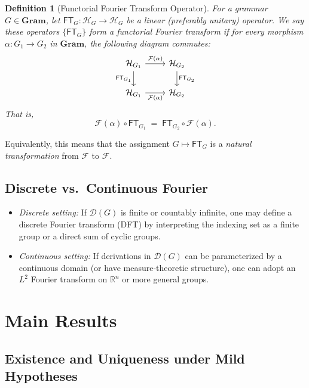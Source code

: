 \documentclass[11pt]{article}
\newtheorem{definition}{Definition}[section]
\begin{document}
\begin{definition}[Functorial Fourier Transform Operator]
For a grammar \(G\in \mathbf{Gram}\), let \(\mathsf{FT}_G : \mathcal{H}_G \to \mathcal{H}_G\) be a linear (preferably unitary) operator. We say these operators \(\{\mathsf{FT}_G\}\) form a \emph{functorial Fourier transform} if for every morphism \(\alpha: G_1 \to G_2\) in \(\mathbf{Gram}\), the following diagram commutes:
\[
\begin{tikzcd}
\mathcal{H}_{G_1} \arrow[r, "\mathcal{F}(\alpha)"] \arrow[d, "\mathsf{FT}_{G_1}"']
& \mathcal{H}_{G_2} \arrow[d, "\mathsf{FT}_{G_2}"] \\
\mathcal{H}_{G_1} \arrow[r, "\mathcal{F}(\alpha)"']
& \mathcal{H}_{G_2}
\end{tikzcd}
\]
That is, 
\[
\mathcal{F}(\alpha) \circ \mathsf{FT}_{G_1} \;=\; \mathsf{FT}_{G_2} \circ \mathcal{F}(\alpha).
\]
\end{definition}

Equivalently, this means that the assignment \(G \mapsto \mathsf{FT}_G\) is a \emph{natural transformation} from \(\mathcal{F}\) to \(\mathcal{F}\).

\subsection{Discrete vs.~Continuous Fourier}

\begin{itemize}
\item \emph{Discrete setting:} If \(\mathcal{D}(G)\) is finite or countably infinite, one may define a discrete Fourier transform (DFT) by interpreting the indexing set as a finite group or a direct sum of cyclic groups.
\item \emph{Continuous setting:} If derivations in \(\mathcal{D}(G)\) can be parameterized by a continuous domain (or have measure-theoretic structure), one can adopt an \(L^2\) Fourier transform on \(\mathbb{R}^n\) or more general groups.
\end{itemize}

\section{Main Results}

\subsection{Existence and Uniqueness under Mild Hypotheses}
\end{document}
